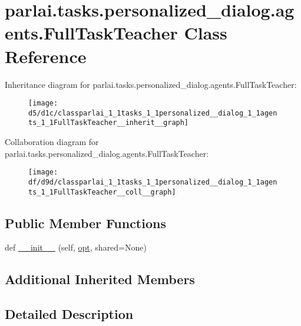 \hypertarget{classparlai_1_1tasks_1_1personalized__dialog_1_1agents_1_1FullTaskTeacher}{}\section{parlai.\+tasks.\+personalized\+\_\+dialog.\+agents.\+Full\+Task\+Teacher Class Reference}
\label{classparlai_1_1tasks_1_1personalized__dialog_1_1agents_1_1FullTaskTeacher}


Inheritance diagram for parlai.\+tasks.\+personalized\+\_\+dialog.\+agents.\+Full\+Task\+Teacher\+:
\nopagebreak
\begin{figure}[H]
\begin{center}
\leavevmode
\texttt{[image: d5/d1c/classparlai\_1\_1tasks\_1\_1personalized\_\_dialog\_1\_1agents\_1\_1FullTaskTeacher\_\_inherit\_\_graph]}
\end{center}
\end{figure}


Collaboration diagram for parlai.\+tasks.\+personalized\+\_\+dialog.\+agents.\+Full\+Task\+Teacher\+:
\nopagebreak
\begin{figure}[H]
\begin{center}
\leavevmode
\texttt{[image: df/d9d/classparlai\_1\_1tasks\_1\_1personalized\_\_dialog\_1\_1agents\_1\_1FullTaskTeacher\_\_coll\_\_graph]}
\end{center}
\end{figure}
\subsection*{Public Member Functions}
\begin{DoxyCompactItemize}
\item 
def \hyperlink{classparlai_1_1tasks_1_1personalized__dialog_1_1agents_1_1FullTaskTeacher_a2f07307405aafc3bc903ce7f172f45c0}{\+\_\+\+\_\+init\+\_\+\+\_\+} (self, \hyperlink{classparlai_1_1core_1_1teachers_1_1FbDialogTeacher_af7a9ec497b9cd0292d7b8fa220da7c28}{opt}, shared=None)
\end{DoxyCompactItemize}
\subsection*{Additional Inherited Members}


\subsection{Detailed Description}


